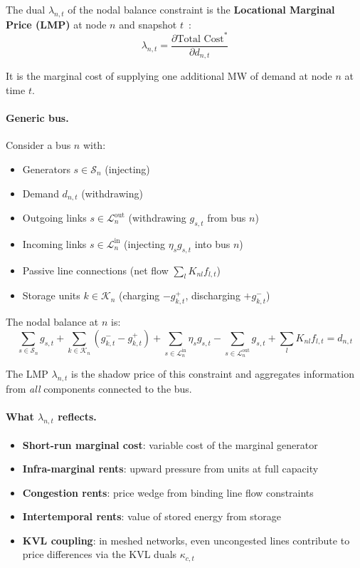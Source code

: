\documentclass{article}
\begin{document}
The dual $\lambda_{n,t}$ of the nodal balance constraint is the
\textbf{Locational Marginal Price (LMP)} at node $n$ and snapshot $t$~\cite{Stoft2002,Varian1992}:
\begin{equation}
    \lambda_{n,t} = \frac{\partial \text{Total Cost}^*}{\partial d_{n,t}}
\end{equation}

It is the marginal cost of supplying one additional MW of demand at node $n$
at time $t$.

\paragraph{Generic bus.}
Consider a bus $n$ with:
\begin{itemize}
    \item Generators $s \in \mathcal{S}_n$ (injecting)
    \item Demand $d_{n,t}$ (withdrawing)
    \item Outgoing links $s \in \mathcal{L}^{\text{out}}_n$ (withdrawing $g_{s,t}$ from bus $n$)
    \item Incoming links $s \in \mathcal{L}^{\text{in}}_n$ (injecting $\eta_s g_{s,t}$ into bus $n$)
    \item Passive line connections (net flow $\sum_l K_{nl} f_{l,t}$)
    \item Storage units $k \in \mathcal{K}_n$ (charging $-g^+_{k,t}$, discharging $+g^-_{k,t}$)
\end{itemize}

The nodal balance at $n$ is:
\begin{equation}
    \sum_{s \in \mathcal{S}_n} g_{s,t}
    + \sum_{k \in \mathcal{K}_n} (g^-_{k,t} - g^+_{k,t})
    + \sum_{s \in \mathcal{L}^{\text{in}}_n} \eta_s g_{s,t}
    - \sum_{s \in \mathcal{L}^{\text{out}}_n} g_{s,t}
    + \sum_l K_{nl} f_{l,t}
    = d_{n,t}
    \label{eq:full_balance}
\end{equation}

The LMP $\lambda_{n,t}$ is the shadow price of this constraint and aggregates
information from \emph{all} components connected to the bus.

\paragraph{What $\lambda_{n,t}$ reflects.}
\begin{itemize}
    \item \textbf{Short-run marginal cost}: variable cost of the marginal generator
    \item \textbf{Infra-marginal rents}: upward pressure from units at full capacity
    \item \textbf{Congestion rents}: price wedge from binding line flow constraints
    \item \textbf{Intertemporal rents}: value of stored energy from storage
    \item \textbf{KVL coupling}: in meshed networks, even uncongested lines
          contribute to price differences via the KVL duals $\kappa_{c,t}$
\end{itemize}
\end{document}
